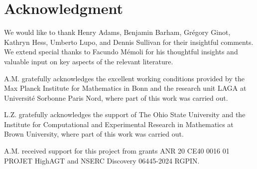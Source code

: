 
\section*{Acknowledgment}

We would like to thank Henry Adams, Benjamin Barham, Gr\'egory Ginot, Kathryn Hess, Umberto Lupo, and Dennis Sullivan for their insightful comments.
We extend special thanks to Facundo M\'{e}moli for his thoughtful insights and valuable input on key aspects of the relevant literature.

A.M. gratefully acknowledges the excellent working conditions provided by the Max Planck Institute for Mathematics in Bonn and the research unit LAGA at Université Sorbonne Paris Nord, where part of this work was carried out.

L.Z. gratefully acknowledges the support of The Ohio State University and the Institute for Computational and Experimental Research in Mathematics at Brown University, where part of this work was carried out.

A.M. received support for this project from grants ANR 20 CE40 0016 01 PROJET HighAGT and NSERC Discovery 06445-2024 RGPIN.